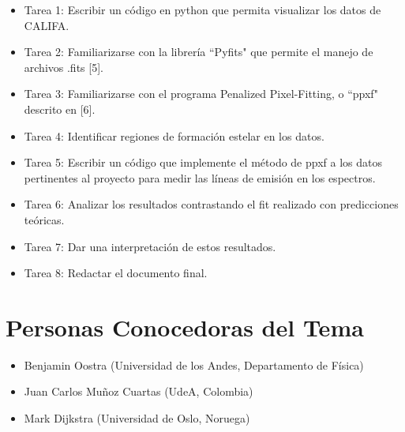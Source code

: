 \documentclass[12pt]{article}
\begin{document}
\begin{itemize}
    \item Tarea 1: Escribir un c\'odigo en python que permita visualizar los datos de CALIFA.
    \item Tarea 2: Familiarizarse con la librer\'ia ``Pyfits" que permite el manejo de archivos .fits [5].
	\item Tarea 3: Familiarizarse con el programa Penalized Pixel-Fitting, o ``ppxf" descrito en [6]. 
	\item Tarea 4: Identificar regiones de formaci\'on estelar en los datos.
    \item Tarea 5: Escribir un c\'odigo que implemente el m\'etodo de
      ppxf a los datos pertinentes al proyecto para medir las l\'ineas
      de emisi\'on en los espectros.
	\item Tarea 6: Analizar los resultados contrastando el fit
          realizado con predicciones te\'oricas.
	\item Tarea 7: Dar una interpretaci\'on de estos resultados.
	
	\item Tarea 8: Redactar el documento final.
\end{itemize}

\section{Personas Conocedoras del Tema}


\begin{itemize}
	\item Benjamin Oostra (Universidad de los Andes, Departamento de F\'isica)
	\item Juan Carlos Mu\~noz Cuartas (UdeA, Colombia)
	\item Mark Dijkstra (Universidad de Oslo, Noruega)
\end{itemize}
\end{document}
